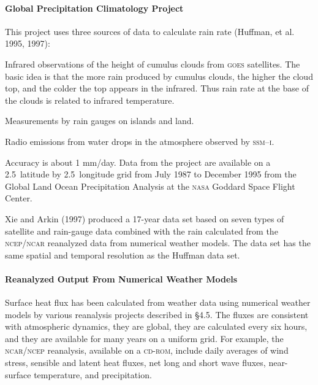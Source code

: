 \paragraph{Global Precipitation Climatology Project} This project uses three sources
of
data to calculate rain rate (Huffman, et al. 1995, 1997):
\begin{enumerate}
\vitem
Infrared observations of the height of cumulus clouds from \textsc{goes}
satellites. The basic idea is that the more rain produced by cumulus clouds,
the higher the cloud top, and the colder the top appears in the infrared. Thus
rain rate at the base of the clouds is related to infrared temperature.

\vitem
Measurements by rain gauges on islands and land.

\vitem
Radio emissions from water drops in the atmosphere observed by \textsc{ssm--i}.
\end{enumerate}
Accuracy is about 1 mm/day. Data from the project are available on a
2.5\degrees\ latitude by 2.5\degrees\ longitude grid from July 1987 to December 1995 from the
Global Land Ocean Precipitation Analysis at the \textsc{nasa} Goddard Space
Flight Center.

Xie and Arkin (1997) produced a 17-year data set based on seven types of
satellite and rain-gauge data combined with the rain calculated from the
\textsc{ncep/ncar} reanalyzed data from numerical weather models. The data set
has the same spatial and temporal resolution as the Huffman data set.

\paragraph{Reanalyzed Output From Numerical Weather Models}
Surface heat
flux has been calculated from weather data using
numerical weather models by various reanalysis projects described in \S 4.5. The fluxes are
consistent with atmospheric dynamics, they are global, they are calculated every six hours,
and they are available for many years on a uniform grid. For example, the \textsc{ncar/ncep}
reanalysis, available on a \textsc{cd-rom}, include daily averages of wind
stress, sensible and latent heat fluxes, net long and
short wave fluxes, near-surface temperature, and precipitation.

